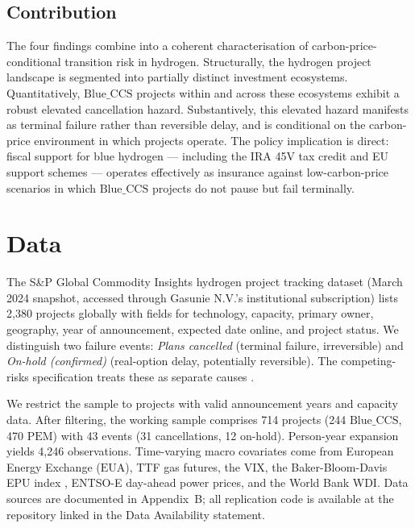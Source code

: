 \documentclass[11pt,a4paper]{article}
\newcommand{\BlueCCS}{\mathrm{Blue\_CCS}}
\newcommand{\PEM}{\mathrm{PEM}}
\newcommand{\EUA}{\mathrm{EUA}}
\begin{document}
\subsection{Contribution}

The four findings combine into a coherent characterisation of carbon-price-conditional transition risk in hydrogen. Structurally, the hydrogen project landscape is segmented into partially distinct investment ecosystems. Quantitatively, $\BlueCCS$ projects within and across these ecosystems exhibit a robust elevated cancellation hazard. Substantively, this elevated hazard manifests as terminal failure rather than reversible delay, and is conditional on the carbon-price environment in which projects operate. The policy implication is direct: fiscal support for blue hydrogen --- including the IRA 45V tax credit and EU support schemes --- operates effectively as insurance against low-carbon-price scenarios in which $\BlueCCS$ projects do not pause but fail terminally.

\section{Data}

The S\&P Global Commodity Insights hydrogen project tracking dataset \citep{SPGlobal2024} (March 2024 snapshot, accessed through Gasunie N.V.'s institutional subscription) lists 2,380 projects globally with fields for technology, capacity, primary owner, geography, year of announcement, expected date online, and project status. We distinguish two failure events: \textit{Plans cancelled} (terminal failure, irreversible) and \textit{On-hold (confirmed)} (real-option delay, potentially reversible). The competing-risks specification treats these as separate causes \citep{FineGray1999}.

We restrict the sample to projects with valid announcement years and capacity data. After filtering, the working sample comprises 714 projects (244 $\BlueCCS$, 470 $\PEM$) with 43 events (31 cancellations, 12 on-hold). Person-year expansion \citep{Allison2014, SingerWillett2003} yields 4,246 observations. Time-varying macro covariates come from European Energy Exchange ($\EUA$), TTF gas futures, the VIX, the Baker-Bloom-Davis EPU index \citep{BakerBloomDavis2016}, ENTSO-E day-ahead power prices, and the World Bank WDI. Data sources are documented in Appendix~B; all replication code is available at the repository linked in the Data Availability statement.
\end{document}
